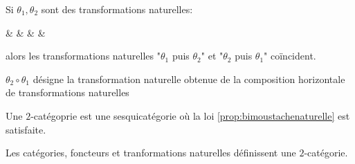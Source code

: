 \documentclass[math, info]{cours}
\begin{document}
\begin{proposition}
	Si $\theta_{1}, \theta_{2}$ sont des transformations naturelles:
	\begin{category}[]
		\A\ar[r, bend left=50, "G_{1}" name=B1]\ar[r, bend right=50, "F_{1}" {swap, name=A1}] & \B\ar[r, bend left=50, "G_{2}" name=B2]\ar[r, bend right=50, "F_{2}" {swap, name=A2}] & \cont & & 
	\end{category}
	alors les transformations naturelles "$\theta_{1}$ puis $\theta_{2}$" et "$\theta_{2}$ puis $\theta_{1}$" coïncident.
	\label{prop:bimoustachenaturelle}
\end{proposition}

\begin{vocabulary}
	$\theta_{2} \circ \theta_{1}$ désigne la transformation naturelle obtenue de la composition horizontale de
	transformations naturelles
\end{vocabulary}

\begin{definition}
	Une $2$-catégoprie est une sesquicatégorie où la loi \ref{prop:bimoustachenaturelle} est satisfaite.
	\label{def:2catégorie}
\end{definition}

\begin{thm}
	Les catégories, foncteurs et tranformations naturelles définissent une $2$-catégorie.
\end{thm}
\end{document}
